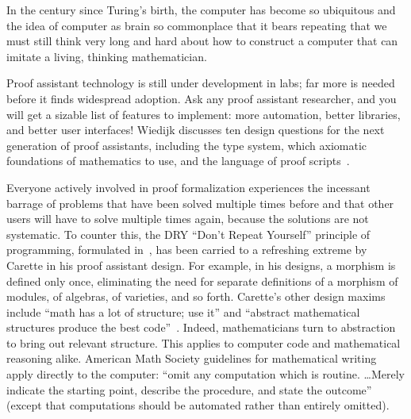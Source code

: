 \documentclass{llncs}
\begin{document}
In the century since Turing's birth, the computer has become so
ubiquitous and the idea of computer as brain so commonplace that it
bears repeating that we must still think very long and hard about how
to construct a computer that can imitate a living, thinking
mathematician.

Proof assistant technology is still under development in labs; far
more is needed before it finds widespread adoption.  Ask any proof
assistant researcher, and you will get a sizable list of features to
implement: more automation, better libraries, and better user
interfaces!  Wiedijk discusses ten design questions for the next
generation of proof assistants, including the type system, which
axiomatic foundations of mathematics to use, and the language of proof
scripts~\cite{Wie10}.

Everyone actively involved in proof formalization experiences the
incessant barrage of problems that have been solved multiple times
before and that other users will have to solve multiple times again,
because the solutions are not systematic.  To counter this, the DRY
``Don't Repeat Yourself'' principle of programming, formulated
in~\cite{PP00}, has been carried to a refreshing extreme by Carette in
his proof assistant design.  For example, in his designs, a morphism
is defined only once, eliminating the need for separate definitions of
a morphism of modules, of algebras, of varieties, and so forth.
Carette's other design maxims include ``math has a lot of structure;
use it'' and ``abstract mathematical structures produce the best
code''~\cite{Car28p}.  Indeed, mathematicians turn to abstraction to
bring out relevant structure. This applies to computer code and
mathematical reasoning alike.  American Math Society guidelines for
mathematical writing apply directly to the computer: ``omit any
computation which is routine. \dots Merely indicate the starting
point, describe the procedure, and state the outcome''~\cite{DCFPS}
(except that computations should be automated rather than entirely
omitted).
\end{document}

